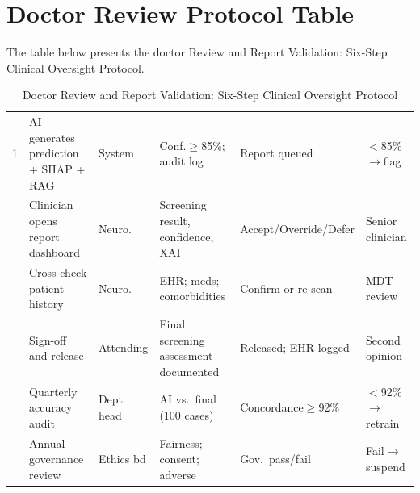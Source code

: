\section*{Doctor Review Protocol Table}
\label{sec:app_ch5_tab_doctor_review_app}
\clearpage

\noindent The table below presents the doctor Review and Report Validation: Six-Step Clinical Oversight Protocol.

\begin{table}[!htbp]
\tablestripes
\tablefontsize
\caption[Doctor Review and Report Validation Protocol]{Doctor Review and Report Validation: Six-Step Clinical Oversight Protocol}
\tablefontsize
\begin{tabularx}{\textwidth}{@{} p{0.3cm} L >{\raggedright\arraybackslash}p{1.2cm} L L L @{}}
\toprule
\thead{\#} &  &  &  &  &  \\
 & AI generates prediction + SHAP + RAG & System & Conf.$\geq$85\%; audit log & Report queued & $<$85\%$\to$flag \\
 & Clinician opens report dashboard & Neuro. & Screening result, confidence, XAI & Accept/Override/Defer & Senior clinician \\
 & Cross-check patient history & Neuro. & EHR; meds; comorbidities & Confirm or re-scan & MDT review \\
 & Sign-off and release & Attending & Final screening assessment documented & Released; EHR logged & Second opinion \\
 & Quarterly accuracy audit & Dept head & AI vs.\ final (100 cases) & Concordance$\geq$92\% & $<$92\%$\to$retrain \\
 & Annual governance review & Ethics bd & Fairness; consent; adverse & Gov.\ pass/fail & Fail$\to$suspend \\
\bottomrule
\end{tabularx}
\end{table}


